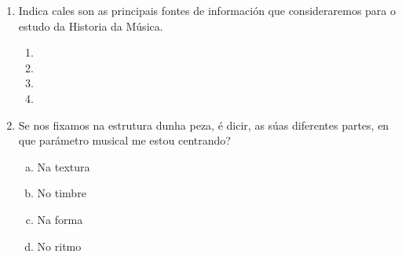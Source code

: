 \begin{ejercicio}
 \begin{enumerate}[1)]
  \item 
  Indica cales son as principais fontes de información que consideraremos para o estudo da Historia da Música.
  \begin{multicols}{2}
  \begin{enumerate}[1.]
   \item \dotfill
   \item \dotfill
   \item \dotfill
   \item \dotfill
  
  \end{enumerate}
  \end{multicols}
  \item
  Se nos fixamos na estrutura dunha peza, é dicir, as súas diferentes partes, en que parámetro musical me estou centrando?
  
  \begin{enumerate}[a)]
   \item 
   Na textura
   \item 
   No timbre
   \item %
   Na forma
   \item
   No ritmo
  \end{enumerate}
 
 \end{enumerate}

\end{ejercicio}
